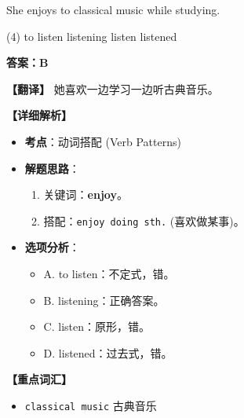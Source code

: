 \documentclass[11pt, a4paper]{article}
\newcommand{\analysis}[4]{
    \begin{solutionbox}
        \textbf{答案：#1}
        
        \textbf{【翻译】} #2
        
        \textbf{【详细解析】}
        #3
        
        \textbf{【重点词汇】}
        #4
    \end{solutionbox}
}
\newcommand{\blank}{\underline{\hspace{1.5cm}}}
\begin{document}
\begin{questions}
    \item She enjoys \blank to classical music while studying.
    \begin{tasks}(4)
        \task to listen \task listening \task listen \task listened
    \end{tasks}
    \analysis{B}{她喜欢一边学习一边听古典音乐。}{
        \begin{itemize}
            \item \textbf{考点}：动词搭配 (Verb Patterns)
            \item \textbf{解题思路}：
                \begin{enumerate}
                    \item 关键词：\textbf{enjoy}。
                    \item 搭配：\texttt{enjoy doing sth.} (喜欢做某事)。
                \end{enumerate}
            \item \textbf{选项分析}：
                \begin{itemize}
                    \item A. to listen：不定式，错。
                    \item B. listening：正确答案。
                    \item C. listen：原形，错。
                    \item D. listened：过去式，错。
                \end{itemize}
        \end{itemize}
    }{
        \begin{itemize}
            \item \texttt{classical music} 古典音乐
        \end{itemize}
    }


\end{questions}
\end{document}
